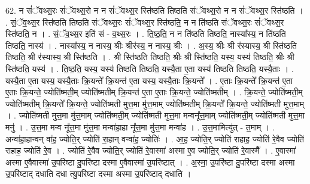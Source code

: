 \documentclass[17pt]{extarticle}
\begin{document}
62. न सं॑ॅवथ्स॒रः सं॑ॅवथ्स॒रो न न सं॑ॅवथ्स॒र स्ति॑ष्ठति तिष्ठति संॅवथ्स॒रो न न सं॑ॅवथ्स॒र स्ति॑ष्ठति । . सं॒ॅव॒थ्स॒र स्ति॑ष्ठति तिष्ठति संॅवथ्स॒रः सं॑ॅवथ्स॒र स्ति॑ष्ठति॒ न न ति॑ष्ठति संॅवथ्स॒रः सं॑ॅवथ्स॒र स्ति॑ष्ठति॒ न । . सं॒ॅव॒थ्स॒र इति॑ सं - व॒थ्स॒रः । . ति॒ष्ठ॒ति॒ न न ति॑ष्ठति तिष्ठति॒ नास्या᳚स्य॒ न ति॑ष्ठति तिष्ठति॒ नास्य॑ । . नास्या᳚स्य॒ न नास्य॒ श्रीः श्रीर॑स्य॒ न नास्य॒ श्रीः । . अ॒स्य॒ श्रीः श्री र॑स्यास्य॒ श्री स्ति॑ष्ठति तिष्ठति॒ श्री र॑स्यास्य॒ श्री स्ति॑ष्ठति । . श्री स्ति॑ष्ठति तिष्ठति॒ श्रीः श्री स्ति॑ष्ठति॒ यस्य॒ यस्य॑ तिष्ठति॒ श्रीः श्री स्ति॑ष्ठति॒ यस्य॑ । . ति॒ष्ठ॒ति॒ यस्य॒ यस्य॑ तिष्ठति तिष्ठति॒ यस्यै॒ता ए॒ता यस्य॑ तिष्ठति तिष्ठति॒ यस्यै॒ताः । . यस्यै॒ता ए॒ता यस्य॒ यस्यै॒ताः क्रि॒यन्ते᳚ क्रि॒यन्त॑ ए॒ता यस्य॒ यस्यै॒ताः क्रि॒यन्ते᳚ । . ए॒ताः क्रि॒यन्ते᳚ क्रि॒यन्त॑ ए॒ता ए॒ताः क्रि॒यन्ते॒ ज्योति॑ष्मती॒म् ज्योति॑ष्मतीम् क्रि॒यन्त॑ ए॒ता ए॒ताः क्रि॒यन्ते॒ ज्योति॑ष्मतीम् । . क्रि॒यन्ते॒ ज्योति॑ष्मती॒म् ज्योति॑ष्मतीम् क्रि॒यन्ते᳚ क्रि॒यन्ते॒ ज्योति॑ष्मती मुत्त॒मा मु॑त्त॒माम् ज्योति॑ष्मतीम् क्रि॒यन्ते᳚ क्रि॒यन्ते॒ ज्योति॑ष्मती मुत्त॒माम् । . ज्योति॑ष्मती मुत्त॒मा मु॑त्त॒माम् ज्योति॑ष्मती॒म् ज्योति॑ष्मती मुत्त॒मा मन्वनू᳚त्त॒माम् ज्योति॑ष्मती॒म् ज्योति॑ष्मती मुत्त॒मा मनु॑ । . उ॒त्त॒मा मन्व नू᳚त्त॒मा मु॑त्त॒मा मन्वा॑हा॒हा नू᳚त्त॒मा मु॑त्त॒मा मन्वा॑ह । . उ॒त्त॒मामित्यु॑त् - त॒माम् । . अन्वा॑हा॒हान्वन् वा॑ह॒ ज्योति॒र् ज्योति॑ रा॒हान् वन्वा॑ह॒ ज्योतिः॑ । . आ॒ह॒ ज्योति॒र् ज्योति॑ राहाह॒ ज्योति॑ रे॒वैव ज्योति॑ राहाह॒ ज्योति॑ रे॒व । . ज्योति॑ रे॒वैव ज्योति॒र् ज्योति॑ रे॒वास्मा॑ अस्मा ए॒व ज्योति॒र् ज्योति॑ रे॒वास्मै᳚ । . ए॒वास्मा॑ अस्मा ए॒वैवास्मा॑ उ॒परि॑ष्टा दु॒परि॑ष्टा दस्मा ए॒वैवास्मा॑ उ॒परि॑ष्टात् । . अ॒स्मा॒ उ॒परि॑ष्टा दु॒परि॑ष्टा दस्मा अस्मा उ॒परि॑ष्टाद् दधाति दधा त्यु॒परि॑ष्टा दस्मा अस्मा उ॒परि॑ष्टाद् दधाति । \newline
\end{document}
